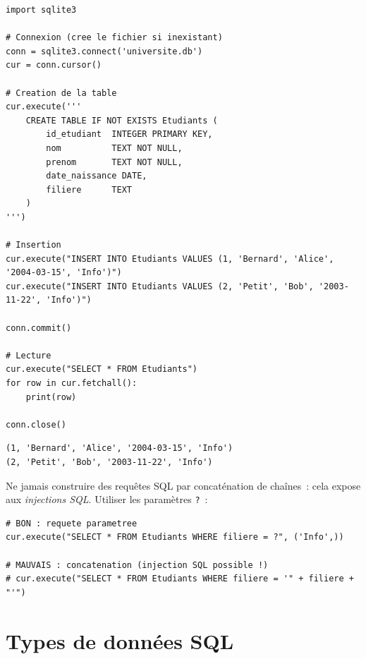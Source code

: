 \begin{codeblock}[title=\textbf{Connexion et cr\'eation de table avec Python}]
\begin{verbatim}
import sqlite3

# Connexion (cree le fichier si inexistant)
conn = sqlite3.connect('universite.db')
cur = conn.cursor()

# Creation de la table
cur.execute('''
    CREATE TABLE IF NOT EXISTS Etudiants (
        id_etudiant  INTEGER PRIMARY KEY,
        nom          TEXT NOT NULL,
        prenom       TEXT NOT NULL,
        date_naissance DATE,
        filiere      TEXT
    )
''')

# Insertion
cur.execute("INSERT INTO Etudiants VALUES (1, 'Bernard', 'Alice', '2004-03-15', 'Info')")
cur.execute("INSERT INTO Etudiants VALUES (2, 'Petit', 'Bob', '2003-11-22', 'Info')")

conn.commit()

# Lecture
cur.execute("SELECT * FROM Etudiants")
for row in cur.fetchall():
    print(row)

conn.close()
\end{verbatim}
\end{codeblock}

\begin{codeoutput}
\begin{verbatim}
(1, 'Bernard', 'Alice', '2004-03-15', 'Info')
(2, 'Petit', 'Bob', '2003-11-22', 'Info')
\end{verbatim}
\end{codeoutput}

\begin{bonnepratique}[title=\textbf{Utiliser des requ\^etes param\'etr\'ees}]
Ne jamais construire des requ\^etes SQL par concat\'enation de cha\^ines~:
cela expose aux \emph{injections SQL}. Utiliser les param\`etres \texttt{?}~:
\begin{verbatim}
# BON : requete parametree
cur.execute("SELECT * FROM Etudiants WHERE filiere = ?", ('Info',))

# MAUVAIS : concatenation (injection SQL possible !)
# cur.execute("SELECT * FROM Etudiants WHERE filiere = '" + filiere + "'")
\end{verbatim}
\end{bonnepratique}

\section{Types de donn\'ees SQL}

